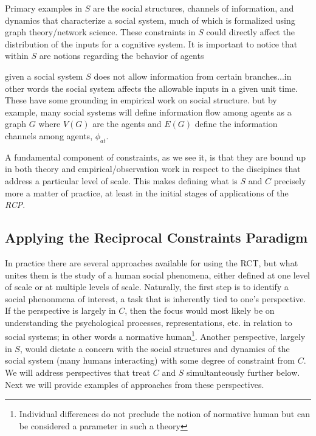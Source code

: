 \documentclass{article}
\begin{document}
Primary examples in $S$ are the social structures, channels of information, and dynamics that characterize a social system, much of which is formalized using graph theory/network science.  These constraints in $S$ could directly affect the distribution of the inputs for a cognitive system.  It is important to notice that within $S$ are notions regarding the behavior of agents   

given a social system $S$ does not allow information from certain branches...in other words the social system affects the allowable inputs in a given unit time.  These have some grounding in empirical work on social structure.   but by example, many social systems will define information flow among agents as a graph $G$ where $V(G)$ are the agents and $E(G)$ define the information channels among agents, $\phi_{at}$.  

A fundamental component of constraints, as we see it, is that they are bound up in both theory and empirical/observation work in respect to the discipines that address a particular level of scale.  This makes defining what is $S$ and $C$ precisely more a matter of practice, at least in the initial stages of applications of the \textit{RCP}. 

\subsection{Applying the Reciprocal Constraints Paradigm}   
In practice there are several approaches available for using the RCT, but what unites them is the study of a human social phenomena, either defined at one level of scale or at multiple levels of scale.  Naturally, the first step is to identify a social phenonmena of interest, a task that is inherently tied to one's perspective.  If the perspective is largely in $C$, then the focus would most likely be on understanding the psychological processes, representations, etc. in relation to social systems; in other words a normative human\footnote{Individual differences do not preclude the notion of normative human but can be considered a parameter in such a theory}.   Another perspective, largely in $S$, would dictate a concern with the social structures and dynamics of the social system (many humans interacting) with some degree of constraint from $C$.  We will address perspectives that treat $C$ and $S$ simultanteously further below.  Next we will provide examples of approaches from these perspectives.
\end{document}
